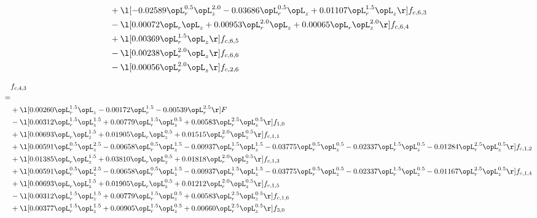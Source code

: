 \begin{alignat}{2}
& + \l[  -0.02589 \opL_r^{0.5} \opL_z^{2.0}   -0.03686 \opL_r^{0.5} \opL_z +  0.01107 \opL_r^{1.5} \opL_z  \r] f_{c,6,3} \nonumber \\ 
& - \l[  0.00072 \opL_r \opL_z +  0.00953 \opL_r^{2.0} \opL_z +  0.00065 \opL_r \opL_z^{2.0}  \r] f_{c,6,4} \nonumber \\ 
& + \l[  0.00369 \opL_r^{1.5} \opL_z  \r] f_{c,6,5} \nonumber \\ 
& - \l[  0.00238 \opL_r^{2.0} \opL_z  \r] f_{c,6,6} \nonumber \\ 
& - \l[  0.00056 \opL_r^{2.0} \opL_z  \r] f_{c,2,6} \nonumber \\ 
\end{alignat} 


\begin{alignat}{2} 
\label{eq:f_43_1} 
& f_{c,4,3} \nonumber \\ 
 = \\ 
& + \l[  0.00260 \opL_r^{1.5} \opL_z   -0.00172 \opL_r^{1.5}   -0.00539 \opL_r^{2.5}  \r] F \nonumber \\ 
& - \l[  0.00312 \opL_r^{1.5} \opL_z^{1.5} +  0.00779 \opL_r^{1.5} \opL_z^{0.5} +  0.00583 \opL_r^{2.5} \opL_z^{0.5}  \r] f_{1,0} \nonumber \\ 
& + \l[  0.00693 \opL_r \opL_z^{1.5} +  0.01905 \opL_r \opL_z^{0.5} +  0.01515 \opL_r^{2.0} \opL_z^{0.5}  \r] f_{c,1,1} \nonumber \\ 
& + \l[  0.00591 \opL_r^{0.5} \opL_z^{2.5}   -0.00658 \opL_r^{0.5} \opL_z^{1.5}   -0.00937 \opL_r^{1.5} \opL_z^{1.5}   -0.03775 \opL_r^{0.5} \opL_z^{0.5}   -0.02337 \opL_r^{1.5} \opL_z^{0.5}   -0.01284 \opL_r^{2.5} \opL_z^{0.5}  \r] f_{c,1,2} \nonumber \\ 
& + \l[  0.01385 \opL_r \opL_z^{1.5} +  0.03810 \opL_r \opL_z^{0.5} +  0.01818 \opL_r^{2.0} \opL_z^{0.5}  \r] f_{c,1,3} \nonumber \\ 
& + \l[  0.00591 \opL_r^{0.5} \opL_z^{2.5}   -0.00658 \opL_r^{0.5} \opL_z^{1.5}   -0.00937 \opL_r^{1.5} \opL_z^{1.5}   -0.03775 \opL_r^{0.5} \opL_z^{0.5}   -0.02337 \opL_r^{1.5} \opL_z^{0.5}   -0.01167 \opL_r^{2.5} \opL_z^{0.5}  \r] f_{c,1,4} \nonumber \\ 
& + \l[  0.00693 \opL_r \opL_z^{1.5} +  0.01905 \opL_r \opL_z^{0.5} +  0.01212 \opL_r^{2.0} \opL_z^{0.5}  \r] f_{c,1,5} \nonumber \\ 
& - \l[  0.00312 \opL_r^{1.5} \opL_z^{1.5} +  0.00779 \opL_r^{1.5} \opL_z^{0.5} +  0.00583 \opL_r^{2.5} \opL_z^{0.5}  \r] f_{c,1,6} \nonumber \\ 
& + \l[  0.00377 \opL_r^{1.5} \opL_z^{1.5} +  0.00905 \opL_r^{1.5} \opL_z^{0.5} +  0.00660 \opL_r^{2.5} \opL_z^{0.5}  \r] f_{3,0} \nonumber \\ 

\end{alignat}
